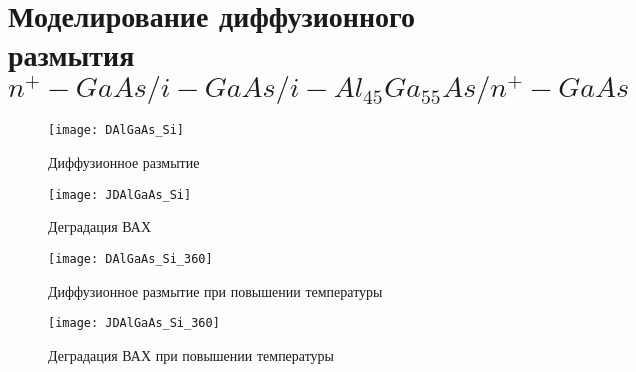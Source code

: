 

\section{Моделирование диффузионного размытия $n^{+}\!-\!GaAs/i\!-\!GaAs/i\!-\!Al_{45}Ga_{55}As/ n^{+}\!-\!GaAs$}

\begin{figure}[h]
  \centering
  \texttt{[image: DAlGaAs\_Si]}
  \caption{Диффузионное размытие}
\end{figure}

\begin{figure}[h]
  \centering
  \texttt{[image: JDAlGaAs\_Si]}
  \caption{Деградация ВАХ}
\end{figure}

\begin{figure}[h]
  \centering
  \texttt{[image: DAlGaAs\_Si\_360]}
  \caption{Диффузионное размытие при повышении температуры}
\end{figure}

\begin{figure}[h]
  \centering
  \texttt{[image: JDAlGaAs\_Si\_360]}
  \caption{Деградация ВАХ при повышении температуры}
\end{figure}